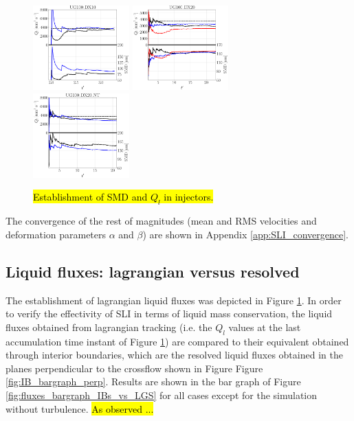 \begin{figure}[ht]
   \includegraphics[width=0.33\textwidth]{./part2_developments/figures_ch5_resolved_JICF/SPRAY_characterization/establishment_and_fluxes/establishment_UG100_DX10}
   \hspace*{-0.1in}
   \includegraphics[width=0.33\textwidth]{./part2_developments/figures_ch5_resolved_JICF/SPRAY_characterization/establishment_and_fluxes/establishment_UG100_DX20}
   \hspace*{-0.1in}
   \includegraphics[width=0.33\textwidth]{./part2_developments/figures_ch5_resolved_JICF/SPRAY_characterization/establishment_and_fluxes/establishment_UG100_DX20_NT}
   \caption{\hl{Establishment of SMD and $Q_l$ in injectors.}}
\label{fig:ch5_spray_char_establishment}
\end{figure}

The convergence of the rest of magnitudes (mean and RMS velocities and deformation parameters $\alpha$ and $\beta$) are shown in Appendix \ref{app:SLI_convergence}.


\subsection{Liquid fluxes: lagrangian versus resolved}
\label{subsec:ch5_sli_fluxes_vs_IBs}

The establishment of lagrangian liquid fluxes was depicted in Figure \ref{fig:ch5_spray_char_establishment}. In order to verify the effectivity of SLI in terms of liquid mass conservation, the liquid fluxes obtained from lagrangian tracking (i.e. the $Q_l$ values at the last accumulation time instant of Figure \ref{fig:ch5_spray_char_establishment}) are compared to their equivalent obtained through interior boundaries, which are the resolved liquid fluxes obtained in the planes perpendicular to the crossflow shown in Figure Figure \ref{fig:IB_bargraph_perp}. Results are shown in the bar graph of Figure \ref{fig:fluxes_bargraph_IBs_vs_LGS} for all cases except for the simulation without turbulence. \hl{As observed ...}

